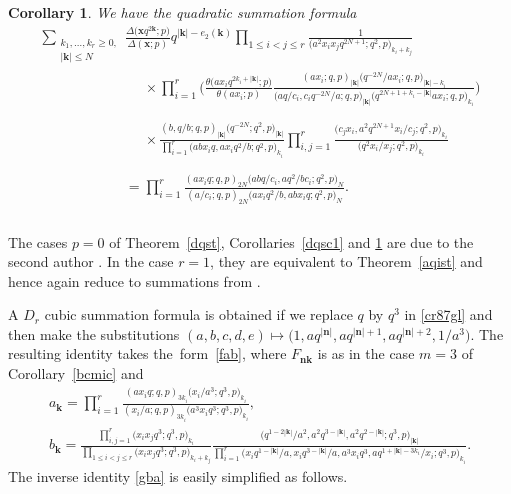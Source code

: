 \documentclass[pdftex]{sigma}%
\numberwithin{equation}{section}
\newtheorem{Corollary}[Theorem]{Corollary}
\def\ta{\theta}
\newcommand\bn{\mathbf n}
\newcommand\bk{\mathbf k}
\newcommand\bx{\mathbf x}
\begin{document}
\begin{Corollary}\label{dqsc2}
We have the quadratic summation formula
\begin{gather*}
\sum_{\substack{k_1,\dots,k_r\ge 0,\\ |\bk|\le N}}
\frac{\Delta\big(\bx q^{2\bk};p\big)}{\Delta(\bx;p)}
q^{|\bk|-e_2(\bk)}
\prod\limits_{1\le i<j\le r}\frac 1{\big(a^2x_ix_jq^{2N+1};q^2,p\big) _{k_i+k_j}}
\\ \phantom{\sum_{\substack{k_1,\dots,k_r\ge 0,\\ |\bk|\le N}}=}{}
\times
\prod\limits_{i=1}^{r}\bigg(\frac{\ta\big(ax_iq^{2k_i+|\bk|};p\big)}{\ta(ax_i;p)}
\frac {(ax_i;q,p)_{|\bk|}
\big(q^{-2N}/ax_i;q,p\big)_{|\bk|-k_i}}
{\big(aq/c_i,c_iq^{-2N}/a;q,p\big)_{|\bk|}\big(q^{2N+1+k_i-|\bk|}ax_i;q,p\big)_{k_i}}\bigg)
\\ \phantom{\sum_{\substack{k_1,\dots,k_r\ge 0,\\ |\bk|\le N}}=}{}
\times\frac{(b,q/b;q,p)_{|\bk|}\big(q^{-2N};q^2,p\big)_{|\bk|}}
{\prod\limits_{i=1}^{r}\big(abx_iq,ax_iq^2/b;q^2,p\big)_{k_i}}
\prod\limits_{i,j=1}^{r}\frac{\big(c_jx_i,a^2q^{2N+1}x_i/c_j;q^2,p\big)_{k_i}}
{\big(q^2x_i/x_j;q^2,p\big)_{k_i}}
\\ \phantom{\sum_{\substack{k_1,\dots,k_r\ge 0,\\ |\bk|\le N}}}{}
=\prod\limits_{i=1} ^{r}\frac{(ax_iq;q,p)_{2N}\big(abq/c_i,aq^2/bc_i;q^2,p\big)_N}
{(a/c_i;q,p)_{2N}\big(ax_iq^2/b,abx_iq;q^2,p\big)_N}.
\end{gather*}
\end{Corollary}

The cases $p=0$ of Theorem~\ref{dqst}, Corollaries~\ref{dqsc1} and \ref{dqsc2}
are due to the second author \mbox{\cite[Theorems~5.21, 5.25 and 5.27]{s}}.
In the case $r=1$, they are equivalent to Theorem~\ref{aqist} and hence again reduce to summations from \cite{w}.

A $D_r$ cubic summation formula is obtained if we replace
$q$ by $q^3$ in \eqref{cr87gl} and then make the substitutions
$(a,b,c,d,e)\mapsto \big(1,aq^{|\bn|},aq^{|\bn|+1},aq^{|\bn|+2},1/a^3\big)$.
The resulting identity takes the~form~\eqref{fab}, where $F_{\bn\bk}$ is as in the case $m=3$ of Corollary~\ref{bcmic} and
\begin{gather*}
a_{\bk}=
\prod\limits_{i=1}^r\frac{(ax_iq;q,p)_{3k_i}\big(x_i/a^3;q^3,p\big)_{k_i}}
{(x_i/a;q,p)_{3k_i}\big(a^3x_iq^3;q^3,p\big)_{k_i}},
\\[-1ex]
b_{\bk}=\frac{\prod\limits_{i, j=1}^r\big(x_ix_jq^3;q^3,p\big)_{k_i}}{\prod\limits_{1\le i<j\le r}\big(x_ix_jq^3;q^3,p\big)_{k_i+k_j}}
\frac{\big(q^{1-2|\bk|}/a^2,a^2q^{3-|\bk|},a^2q^{2-|\bk|};q^3,p\big)_{|\bk|}}{\prod\limits_{i=1} ^{r}
\big(x_iq^{1-|\bk|}/a,x_iq^{3-|\bk|}/a,a^3x_iq^3,aq^{1+|\bk|-3k_i}/x_i;q^3,p\big)_{k_i}}.
\end{gather*}
The inverse identity \eqref{gba} is easily simplified as follows.
\end{document}
